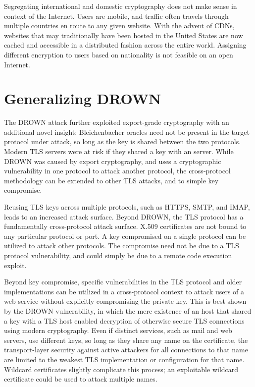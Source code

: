 Segregating international and domestic cryptography does not make sense in
context of the Internet. Users are mobile, and traffic often travels through
multiple countries en route to any given website. With the advent of CDNs,
websites that may traditionally have been hosted in the United States are now
cached and accessible in a distributed fashion across the entire world.
Assigning different encryption to users based on nationality is not feasible
on an open Internet.

\section{Generalizing DROWN}

The DROWN attack further exploited export-grade cryptography with an
additional novel insight: Bleichenbacher oracles need not be present in the
target protocol under attack, so long as the key is shared between the two
protocols. Modern TLS servers were at risk if they shared a key with an
\ssltwo server. While DROWN was caused by export cryptography, and uses a
cryptographic vulnerability in one protocol to attack another protocol, the
cross-protocol methodology can be extended to other TLS attacks, and to
simple key compromise.

Reusing TLS keys across multiple protocols, such as HTTPS, SMTP, and IMAP,
leads to an increased attack surface. Beyond DROWN, the TLS protocol has a
fundamentally cross-protocol attack surface. X.509 certificates are not bound
to any particular protocol or port. A key compromised on a single protocol
can be utilized to attack other protocols. The compromise need not be due to
a TLS protocol vulnerability, and could simply be due to a remote code
execution exploit.

Beyond key compromise, specific vulnerabilities in the TLS protocol and older
implementations can be utilized in a cross-protocol context to attack users
of a web service without explicitly compromising the private key. This is
best shown by the DROWN vulnerability, in which the mere existence of an
\ssltwo host that shared a key with a TLS host enabled decryption of
otherwise secure TLS connections using modern cryptography. Even if distinct
services, such as mail and web servers, use different keys, so long as they
share any name on the certificate, the transport-layer security against
active attackers for all connections to that name are limited to the weakest
TLS implementation or configuration for that name. Wildcard certificates
slightly complicate this process; an exploitable wildcard certificate could
be used to attack multiple names.

